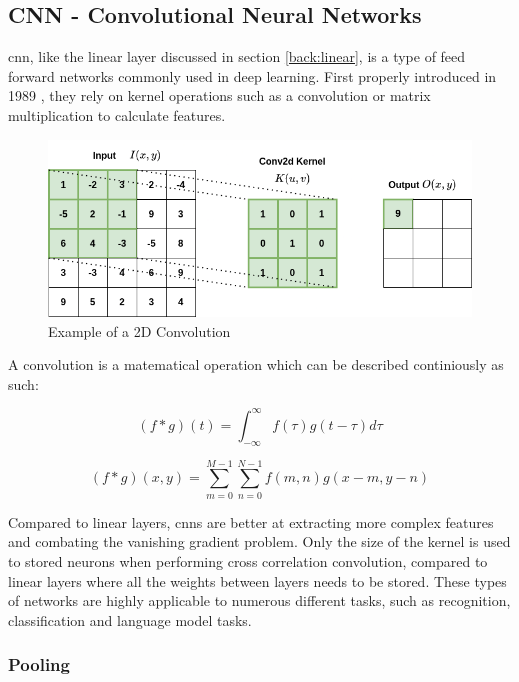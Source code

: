 \subsection{CNN - Convolutional Neural Networks}
\label{back:cnn}

\acrfull{cnn}, like the linear layer discussed in section \ref{back:linear}, is a type of feed forward networks commonly used in deep learning. First properly introduced in 1989 \cite{NIPS1989_53c3bce6}, they rely on kernel operations such as a convolution or matrix multiplication to calculate features.    \\

\begin{figure}[h]
    \centering
    \includegraphics[width=0.8\linewidth]{figures/convolution.png}
    \caption{Example of a 2D Convolution}
    \label{fig:2dconv}
\end{figure}

A convolution is a matematical operation which can be described continiously as such:

\begin{equation}
(f * g)(t) = \int_{-\infty}^{\infty} f(\tau) g(t - \tau) d\tau
\label{eq:contconv}
\end{equation}

\begin{equation}
   (f * g)(x, y) = \sum_{m=0}^{M-1} \sum_{n=0}^{N-1} f(m, n)g(x-m, y-n) 
\label{eq:conv}
\end{equation}

Compared to linear layers, \acrshort{cnn}s are better at extracting more complex features and combating the vanishing gradient problem. Only the size of the kernel is used to stored neurons when performing cross correlation convolution, compared to linear layers where all the weights between layers needs to be stored. These types of networks are highly applicable to numerous different tasks, such as recognition, classification and language model tasks. \\

\subsubsection{Pooling}

